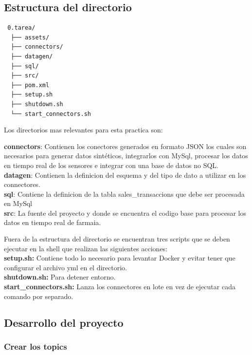 \documentclass[
]{article}
\begin{document}
\hypertarget{estructura-del-directorio}{%
\subsection{Estructura del directorio}\label{estructura-del-directorio}}

\begin{verbatim}
 0.tarea/
  ├── assets/
  ├── connectors/
  ├── datagen/
  ├── sql/
  ├── src/
  ├── pom.xml
  ├── setup.sh
  ├── shutdown.sh
  └── start_connectors.sh
\end{verbatim}

Los directorios mas relevantes para esta practica son:

\textbf{connectors}: Contienen los conectores generados en formato JSON
los cuales son necesarios para generar datos sintéticos, integrarlos con
MySql, procesar los datos en tiempo real de los sensores e integrar con
una base de datos no SQL.\\
\textbf{datagen}: Contienen la definicion del esquema y del tipo de dato
a utilizar en los connectores.\\
\textbf{sql}: Contiene la definicion de la tabla sales\_transaccions que
debe ser procesada en MySql\\
\textbf{src}: La fuente del proyecto y donde se encuentra el codigo base
para procesar los datos en tiempo real de farmaia.

Fuera de la estructura del directorio se encuentran tres scripts que se
deben ejecutar en la shell que realizan las siguientes acciones:\\
\textbf{setup.sh:} Contiene todo lo necesario para levantar Docker y
evitar tener que configurar el archivo yml en el directorio.\\
\textbf{shutdown.sh:} Para detener entorno.\\
\textbf{start\_connectors.sh:} Lanza los connectores en lote en vez de
ejecutar cada comando por separado.

\hypertarget{desarrollo-del-proyecto}{%
\subsection{Desarrollo del proyecto}\label{desarrollo-del-proyecto}}

\hypertarget{crear-los-topics}{%
\subsubsection{Crear los topics}\label{crear-los-topics}}
\end{document}
